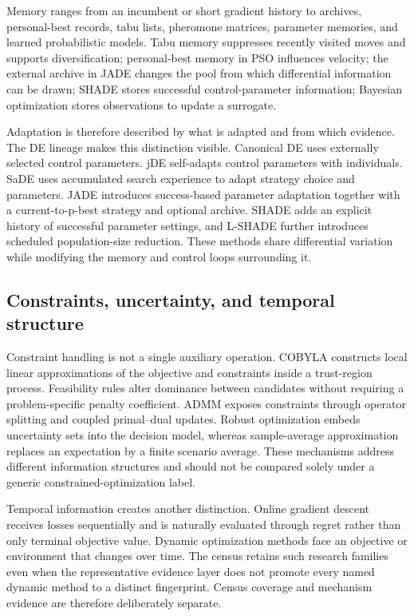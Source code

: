 Memory ranges from an incumbent or short gradient history to archives, personal-best records, tabu lists, pheromone matrices, parameter memories, and learned probabilistic models. Tabu memory suppresses recently visited moves and supports diversification; personal-best memory in PSO influences velocity; the external archive in JADE changes the pool from which differential information can be drawn; SHADE stores successful control-parameter information; Bayesian optimization stores observations to update a surrogate.

Adaptation is therefore described by what is adapted and from which evidence. The DE lineage makes this distinction visible. Canonical DE uses externally selected control parameters. jDE self-adapts control parameters with individuals. SaDE uses accumulated search experience to adapt strategy choice and parameters. JADE introduces success-based parameter adaptation together with a current-to-p-best strategy and optional archive. SHADE adds an explicit history of successful parameter settings, and L-SHADE further introduces scheduled population-size reduction. These methods share differential variation while modifying the memory and control loops surrounding it.

\subsection{Constraints, uncertainty, and temporal structure}

Constraint handling is not a single auxiliary operation. COBYLA constructs local linear approximations of the objective and constraints inside a trust-region process. Feasibility rules alter dominance between candidates without requiring a problem-specific penalty coefficient. ADMM exposes constraints through operator splitting and coupled primal--dual updates. Robust optimization embeds uncertainty sets into the decision model, whereas sample-average approximation replaces an expectation by a finite scenario average. These mechanisms address different information structures and should not be compared solely under a generic constrained-optimization label.

Temporal information creates another distinction. Online gradient descent receives losses sequentially and is naturally evaluated through regret rather than only terminal objective value. Dynamic optimization methods face an objective or environment that changes over time. The census retains such research families even when the representative evidence layer does not promote every named dynamic method to a distinct fingerprint. Census coverage and mechanism evidence are therefore deliberately separate.


